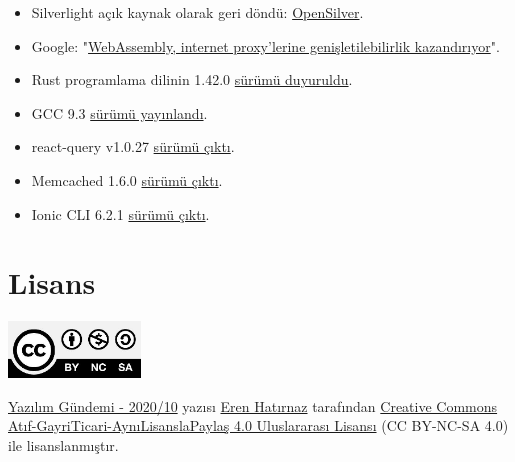\documentclass[11pt]{article}
\begin{document}
\begin{itemize}
\item Silverlight açık kaynak olarak geri döndü: \href{https://www.opensilver.net/announcements/introducing-opensilver.aspx}{OpenSilver}.
\item Google: "\href{https://opensource.googleblog.com/2020/03/webassembly-brings-extensibility-to.html?m=1}{WebAssembly, internet proxy'lerine genişletilebilirlik
kazandırıyor}".
\item Rust programlama dilinin 1.42.0 \href{https://blog.rust-lang.org/2020/03/12/Rust-1.42.html}{sürümü duyuruldu}.
\item GCC 9.3 \href{https://lists.gnu.org/archive/html/info-gnu/2020-03/msg00006.html}{sürümü yayınlandı}.
\item react-query v1.0.27 \href{https://github.com/tannerlinsley/react-query/blob/master/CHANGELOG.md\#1027}{sürümü çıktı}.
\item Memcached 1.6.0 \href{https://github.com/memcached/memcached/wiki/ReleaseNotes160}{sürümü çıktı}.
\item Ionic CLI 6.2.1 \href{https://github.com/ionic-team/ionic-cli/releases/tag/\%2540ionic\%252Fcli\%25406.2.1}{sürümü çıktı}.
\end{itemize}
\section{Lisans}
\label{sec:org75984f8}
\begin{center}
\begin{center}
\includegraphics[height=1.5cm]{../../../img/CC_BY-NC-SA_4.0.png}
\end{center}

\href{yazilim-gundemi-2020-10.pdf}{Yazılım Gündemi - 2020/10} yazısı \href{https://erenhatirnaz.github.io}{Eren Hatırnaz} tarafından \href{http://creativecommons.org/licenses/by-nc-sa/4.0/}{Creative Commons
Atıf-GayriTicari-AynıLisanslaPaylaş 4.0 Uluslararası Lisansı} (CC BY-NC-SA 4.0)
ile lisanslanmıştır.
\end{center}
\end{document}
